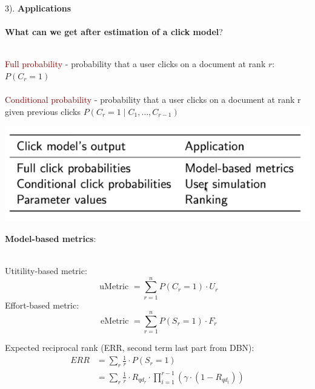 \vspace{0.5cm}

{\huge 3). \textbf{Applications} } \\
\\
\textbf{What can we get after estimation of a click model}?\\
\\
\begin{minipage}{0.5\textwidth}
\textcolor{Maroon}{Full probability} - probability that a user clicks on a document at rank $r$: $P(C_r = 1)$ \\
\\
\textcolor{Maroon}{Conditional probability} - probability that a user clicks on a document at rank r given previous clicks $P(C_r = 1 \mid C_1, \ldots, C_{r-1})$
\end{minipage}
\begin{minipage}{0.5\textwidth}
\;\;\;\; \includegraphics[scale=0.6]{figures/applications.png}
\end{minipage}

\vspace{0.65cm}

\textbf{Model-based metrics}: \\
\\
\begin{minipage}{0.5\textwidth}
Utitility-based metric: 
$$ \text { uMetric }=\sum_{r=1}^{n} P\left(C_{r}=1\right) \cdot U_{r}$$ 
Effort-based metric: 
$$\text { eMetric }=\sum_{r=1}^{n} P\left(S_{r}=1\right) \cdot F_{r}$$
\end{minipage}
\begin{minipage}{0.5\textwidth}
Expected reciprocal rank (ERR, second term last part from DBN): \\
\begin{align*}
    ERR &= \sum_r \frac{1}{r} \cdot P(S_r = 1) \\
    &= \sum_r \frac{1}{r} \cdot R_{qd_{r}} \cdot \prod^{r-1}_{i=1}(\gamma \cdot (1 - R_{qd_{i}})) 
\end{align*}
\end{minipage}

